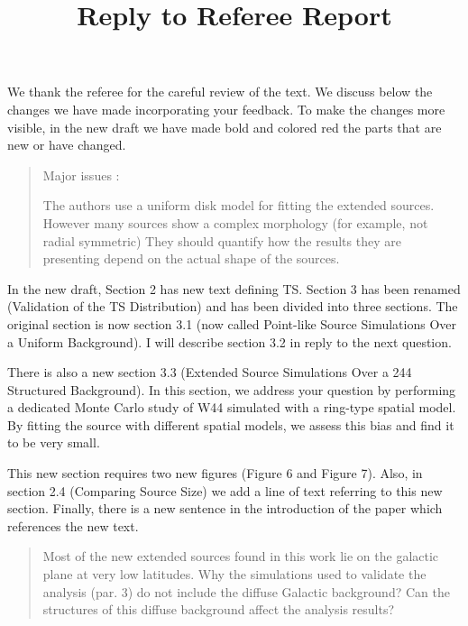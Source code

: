 \documentclass{article}
\title{Reply to Referee Report}
\newenvironment{referee}
{\begin{quote}\color{red}}
  {\end{quote}}
\newenvironment{reply}
  {}
  {}
\begin{document}
\maketitle

\begin{reply}
  We thank the referee for the careful review of the text. We discuss below the
changes we have made incorporating your feedback. To make the changes more visible,
in the new draft we have made bold and colored red the parts that are new or have changed.
\end{reply}

\begin{referee}
Major issues :

The authors use a uniform disk model for fitting the extended sources.
However many sources show a complex morphology (for example, not radial symmetric)
They should quantify how the results they are presenting depend on the actual shape of the sources.
\end{referee}


\begin{reply}
In the new draft, Section 2 has new text defining TS.
Section 3 has been renamed (Validation of the TS Distribution) and has been
divided into three sections. The original section is now section 3.1
(now called Point-like Source Simulations Over a Uniform Background).
I will describe section 3.2 in reply to the next question.

There is also a new section 3.3 (Extended Source Simulations Over a 244 Structured Background). 
In this section, we address your question by performing
a dedicated Monte Carlo study of W44 simulated with a ring-type spatial
model. By fitting the source with different spatial models, we assess
this bias and find it to be very small.

This new section requires two new figures (Figure 6 and Figure 7). Also,
in section 2.4 (Comparing Source Size) we add a line of text referring
to this new section. Finally, there is a new sentence in the introduction
of the paper which references the new text.
\end{reply}


\begin{referee}
Most of the new extended sources found in this work lie on the galactic
plane at very low latitudes. Why the simulations used to validate the
analysis (par. 3) do not include the diffuse Galactic background? Can
the structures of this diffuse background affect the analysis results?
\end{referee}
\end{document}
